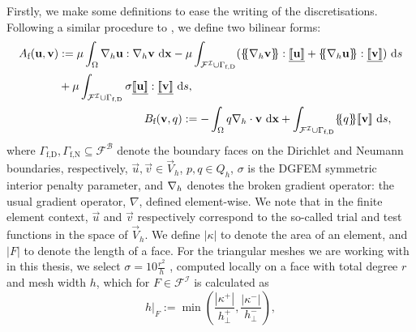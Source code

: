             Firstly, we make some definitions to ease the writing of the discretisations. Following a similar procedure to \cite{cockburnLocallyConservativeLDG2004,cliffeAdaptiveDiscontinuousGalerkin2010,gianiGoalorientedAdaptiveComposite2014}, we define two bilinear forms:
            \begin{align}
                \begin{split}
                    A_\text{f}(\vec{u}, \vec{v}) & := \mu \int_\Omega \nablab \vec{u} : \nablab \vec{v} \diff\vec{x} - \mu \int_{\mathcal{F}^\mathcal{I} \cup \Gamma_\text{f,D}} (\average{\nablab \vec{v}} : \jumpvec{\vec{u}} + \average{\nablab \vec{u}} : \jumpvec{\vec{v}}) \diff s \\ & + \mu \int_{\mathcal{F}^\mathcal{I} \cup \Gamma_\text{f,D}} \sigma \jumpvec{\vec{u}} : \jumpvec{\vec{v}} \diff s,
                \end{split}\\
                \begin{split}
                    B_\text{f}(\vec{v}, q) & := -\int_\Omega q \nablab \cdot \vec{v} \diff\vec{x} + \int_{\mathcal{F}^\mathcal{I} \cup \Gamma_\text{f,D}} \average{q} \jump{\vec{v}} \diff s,
                \end{split}
            \end{align}
            where $\Gamma_\text{f,D}, \Gamma_\text{f,N} \subseteq \mathcal{F}^\mathcal{B}$ denote the boundary faces on the Dirichlet and Neumann boundaries, respectively, $\vec{u}, \vec{v} \in \vec{V}_h$, $p, q \in Q_h$, $\sigma$ is the DGFEM symmetric interior penalty parameter, and $\nabla_h$ denotes the broken gradient operator: the usual gradient operator, $\nabla$, defined element-wise. We note that in the finite element context, $\vec{u}$ and $\vec{v}$ respectively correspond to the so-called trial and test functions in the space of $\vec{V}_h$. We define $|\kappa|$ to denote the area of an element, and $|F|$ to denote the length of a face. For the triangular meshes we are working with in this thesis, we select $\sigma = 10 \frac{r^2}{h}$ \cite{cangianiHpVersionDiscontinuousGalerkin2017, houstonEnergyNormShape2005, houstonAutomaticSymbolicComputation2018}, computed locally on a face with total degree $r$ and mesh width $h$, which for $F \in \mathcal{F}^\mathcal{I}$ is calculated as
            \begin{equation*}
                h|_F := \min \left( \frac{|\kappa^+|}{h^+_\perp}, \frac{|\kappa^-|}{h^-_\perp} \right),
            \end{equation*}

